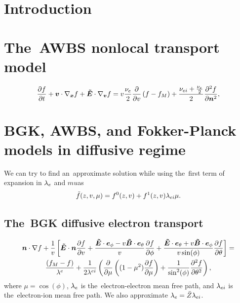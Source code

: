 \documentclass[preprint,12pt]{elsarticle}
\newcounter{bla}
\begin{document}
 \linenumbers
\pagebreak
\tableofcontents
\pagebreak

\section{Introduction}
\label{sec:Intro}

\section{The~AWBS nonlocal transport model}
\label{sec:AWBSmodel}
\begin{equation}
  \frac{\partial{f}}{\partial{t}} + \boldsymbol{v}\cdot\nabla_{\boldsymbol{x}} f + \boldsymbol{\tilde{E}} \cdot\nabla_{\boldsymbol{v}} f =
  v \frac{\nu_{e}}{2}\frac{\partial{}}{\partial{v}}\left(f - f_M\right) 
  + \frac{\nu_{ei} + \frac{\nu_{e}}{2}}{2} \frac{\partial^2 f}{\partial \boldsymbol{n}^2}
  , \label{eq:AWBS_model}
\end{equation}
\cite{Fish_RMP1987}

\section{BGK, AWBS, and Fokker-Planck models in diffusive regime}
\label{sec:DiffusiveKinetics}

We can try to find an~approximate solution while using the~first term of
expansion in $\lambda_e$ and $mu$as
\begin{equation}
  \tilde{f}(z, v, \mu) = f^0(z, v) + f^1(z, v) \lambda_{ei}\mu .
  \label{eq:f_approximation}
\end{equation}


\subsection{The~BGK diffusive electron transport}
\label{sec:BGKDiffusiveRegime}

\begin{multline}
  \boldsymbol{n}\cdot\nabla f + \frac{1}{v} \left[ \boldsymbol{\tilde{E}}\cdot\boldsymbol{n} \frac{\partial{f}}{\partial{v}} 
  + \frac{\boldsymbol{\tilde{E}}\cdot\boldsymbol{e}_\phi 
  - v\boldsymbol{\tilde{B}}\cdot\boldsymbol{e}_\theta}{v}\frac{\partial{f}}{\partial{\phi}}
  + \frac{\boldsymbol{\tilde{E}}\cdot\boldsymbol{e}_\theta + v\boldsymbol{\tilde{B}}\cdot\boldsymbol{e}_\phi}
  {v\sin(\phi)}\frac{\partial{f}}{\partial{\theta}} \right] 
  =\\
  \frac{\left(f_M - f\right)}{\lambda^e} 
  + \frac{1}{2 \lambda^{ei}} 
  \left(\frac{\partial{}}{\partial{\mu}}\left((1 - \mu^2)\frac{\partial{f}}{\partial{\mu}}\right)
  + \frac{1}{\sin^2(\phi)}\frac{\partial^2f}{\partial\theta^2} \right) ,
  \label{eq:BGK_spherical}
\end{multline}
where $\mu = \cos(\phi)$, $\lambda_e$ is the~electron-electron mean free path, and
$\lambda_{ei}$ is the~electron-ion mean free path. We also approximate
$\lambda_e = \bar{Z} \lambda_{ei}$.
\end{document}
